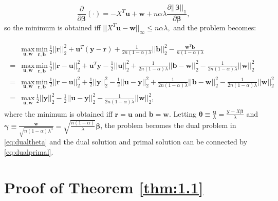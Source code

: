 \begin{equation}
    \label{eq:partialbeta}
    \frac{\partial}{\partial\boldsymbol\beta}(\cdot) =-X^T\boldsymbol u+\boldsymbol w+n\alpha\lambda\frac{\partial||\boldsymbol\beta||_1}{\partial\boldsymbol\beta},
\end{equation}
so the minimum is obtained iff $||X^T\boldsymbol u-\boldsymbol w||_\infty\leq n\alpha\lambda,$ and the problem becomes:

\begin{gather}
    \label{eq:dualuw}
    \begin{aligned}
        &\underset{\boldsymbol u,\boldsymbol w}{\mathrm{max}}\,\underset{\boldsymbol r,\boldsymbol b}{\mathrm{min}}\,\frac{1}{2}||\boldsymbol r||_2^2+\boldsymbol u^T(\boldsymbol y-\boldsymbol r)+\frac{1}{2n(1-\alpha)\lambda}||\boldsymbol b||_2^2-\frac{\boldsymbol w^T\boldsymbol b}{n(1-\alpha)\lambda}\\
        =&\underset{\boldsymbol u,\boldsymbol w}{\mathrm{max}}\,\underset{\boldsymbol r,\boldsymbol b}{\mathrm{min}}\,\frac{1}{2}||\boldsymbol r-\boldsymbol u||_2^2+\boldsymbol u^T\boldsymbol y-\frac{1}{2}||\boldsymbol u||_2^2+\frac{1}{2n(1-\alpha)\lambda}||\boldsymbol b-\boldsymbol w||_2^2-\frac{1}{2n(1-\alpha)\lambda}||\boldsymbol w||_2^2\\
        =&\underset{\boldsymbol u,\boldsymbol w}{\mathrm{max}}\,\underset{\boldsymbol r,\boldsymbol b}{\mathrm{min}}\,\frac{1}{2}||\boldsymbol r-\boldsymbol u||_2^2+\frac{1}{2}||\boldsymbol y||_2^2-\frac{1}{2}||\boldsymbol u-\boldsymbol y||_2^2+\frac{1}{2n(1-\alpha)\lambda}||\boldsymbol b-\boldsymbol w||_2^2-\frac{1}{2n(1-\alpha)\lambda}||\boldsymbol w||_2^2\\
        =&\underset{\boldsymbol u,\boldsymbol w}{\mathrm{max}}\,\frac{1}{2}||\boldsymbol y||_2^2-\frac{1}{2}||\boldsymbol u-\boldsymbol y||_2^2-\frac{1}{2n(1-\alpha)\lambda}||\boldsymbol w||_2^2,
    \end{aligned}
\end{gather}
where the minimum is obtained iff $\boldsymbol r=\boldsymbol u$ and $\boldsymbol b=\boldsymbol w$. Letting $\boldsymbol\theta\equiv\frac{\boldsymbol u}{\lambda}=\frac{\boldsymbol y-X\boldsymbol\beta}{\lambda}$ and $\boldsymbol\gamma\equiv\frac{\boldsymbol w}{\sqrt{n(1-\alpha)\lambda^3}}=\sqrt{\frac{n(1-\alpha)}{\lambda}}\boldsymbol\beta$, the problem becomes the dual problem in \eqref{eq:dualtheta} and the dual solution and primal solution can be connected by \eqref{eq:dualprimal}.

\section{Proof of Theorem \ref{thm:1.1}}


